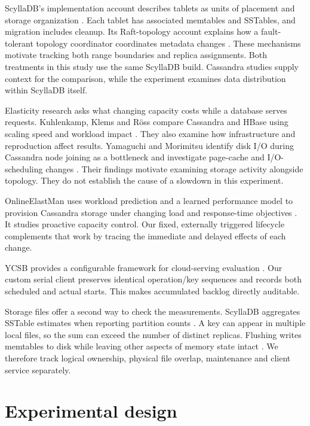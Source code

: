 ScyllaDB's implementation account describes tablets as units of placement and storage organization \cite{r27}. Each tablet has associated memtables and SSTables, and migration includes cleanup. Its Raft-topology account explains how a fault-tolerant topology coordinator coordinates metadata changes \cite{r28}. These mechanisms motivate tracking both range boundaries and replica assignments. Both treatments in this study use the same ScyllaDB build. Cassandra studies supply context for the comparison, while the experiment examines data distribution within ScyllaDB itself.

Elasticity research asks what changing capacity costs while a database serves requests. Kuhlenkamp, Klems and Röss compare Cassandra and HBase using scaling speed and workload impact \cite{r30}. They also examine how infrastructure and reproduction affect results. Yamaguchi and Morimitsu identify disk I/O during Cassandra node joining as a bottleneck and investigate page-cache and I/O-scheduling changes \cite{r31}. Their findings motivate examining storage activity alongside topology. They do not establish the cause of a slowdown in this experiment.

OnlineElastMan uses workload prediction and a learned performance model to provision Cassandra storage under changing load and response-time objectives \cite{r32}. It studies proactive capacity control. Our fixed, externally triggered lifecycle complements that work by tracing the immediate and delayed effects of each change.

YCSB provides a configurable framework for cloud-serving evaluation \cite{r26}. Our custom serial client preserves identical operation/key sequences and records both scheduled and actual starts. This makes accumulated backlog directly auditable.

Storage files offer a second way to check the measurements. ScyllaDB aggregates SSTable estimates when reporting partition counts \cite{r21}. A key can appear in multiple local files, so the sum can exceed the number of distinct replicas. Flushing writes memtables to disk while leaving other aspects of memory state intact \cite{r5}. We therefore track logical ownership, physical file overlap, maintenance and client service separately.

\newpage

\hypertarget{experimental-design}{%
\section{Experimental design}\label{experimental-design}}

